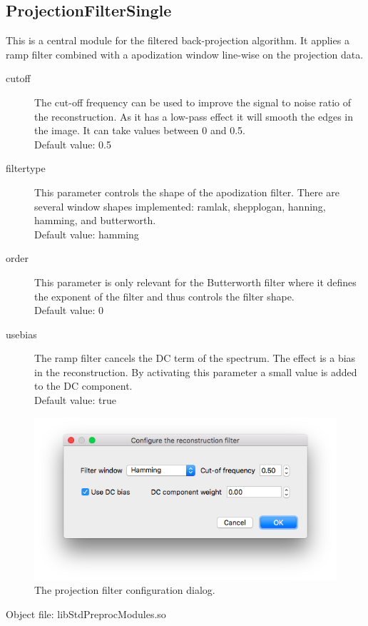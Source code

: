 \documentclass[a4paper]{scrreprt}
\begin{document}
\subsection{ProjectionFilterSingle}
This is a central module for the filtered back-projection algorithm. It applies a ramp filter combined with a apodization window line-wise on the projection data.
\begin{description}
 \item[cutoff] The cut-off frequency can be used to improve the signal to noise ratio of the reconstruction. As it has a low-pass effect it will smooth the edges in the image. It can take values between 0 and 0.5. \\Default value: 0.5
 \item[filtertype] This parameter controls the shape of the apodization filter. There are several window shapes implemented: ramlak, shepplogan, hanning, hamming, and butterworth. \\Default value: hamming
 \item[order] This parameter is only relevant for the Butterworth filter where it defines the exponent of the filter and thus controls the filter shape. \\ Default value: 0
 \item[usebias] The ramp filter cancels the DC term of the spectrum. The effect is a bias in the reconstruction. By activating this parameter a small value is added to the DC component.\\Default value: true
\end{description}
\begin{figure}[ht!]
\centering
\includegraphics[scale=0.5]{figures3/Module_ProjectionFilter.png}
\caption{The projection filter configuration dialog.}
\end{figure}
Object file: libStdPreprocModules.so
\end{document}
